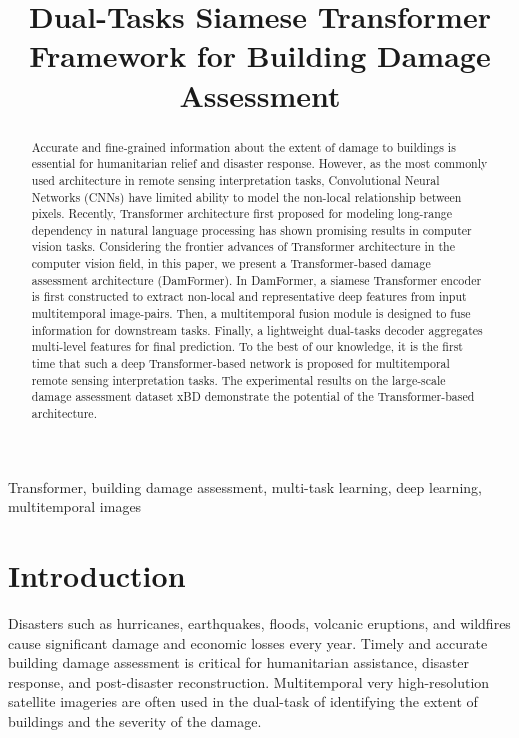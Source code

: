 \documentclass{article}
\title{Dual-Tasks Siamese Transformer Framework for Building Damage Assessment}
\begin{document}
\maketitle
\begin{abstract}
Accurate and fine-grained information about the extent of damage to buildings is essential for humanitarian relief and disaster response. However, as the most commonly used architecture in remote sensing interpretation tasks, Convolutional Neural Networks (CNNs) have limited ability to model the non-local relationship between pixels. Recently, Transformer architecture first proposed for modeling long-range dependency in natural language processing has shown promising results in computer vision tasks. Considering the frontier advances of Transformer architecture in the computer vision field, in this paper, we present a Transformer-based damage assessment architecture (DamFormer). In DamFormer, a siamese Transformer encoder is first constructed to extract non-local and representative deep features from input multitemporal image-pairs. Then, a multitemporal fusion module is designed to fuse information for downstream tasks. Finally, a lightweight dual-tasks decoder aggregates multi-level features for final prediction. To the best of our knowledge, it is the first time that such a deep Transformer-based network is proposed for multitemporal remote sensing interpretation tasks. The experimental results on the  large-scale damage assessment dataset xBD demonstrate the potential of the Transformer-based architecture.
\end{abstract}
\begin{keywords}Transformer, building damage assessment, multi-task learning, deep learning, multitemporal images
\end{keywords}
\section{Introduction}
\label{sec:intro}

\par Disasters such as hurricanes, earthquakes, floods, volcanic eruptions, and wildfires cause significant damage and economic losses every year. Timely and accurate building damage assessment is critical for humanitarian assistance, disaster response, and post-disaster reconstruction. Multitemporal very high-resolution satellite imageries are often used in the dual-task of identifying the extent of buildings and the severity of the damage. 
\end{document}

